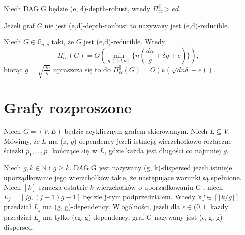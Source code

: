 \begin{theorem} \cite[Twierdzenie 4]{depth}
	Niech DAG G będzie (e, d)-depth-robust, wtedy $ \Pi_{ cc }^{ \parallel } > ed$.
\end{theorem}

\begin{definition}
	Jeżeli graf $G$ nie jest (e,d)-depth-roubust to nazywany jest (e,d)-reducible.
\end{definition}

\begin{theorem} \cite[Twierdzenie 10]{depth} \label{1::redu}
	Niech $G \in \mathbb{G}_{n, \delta}$ taki, że $G$ jest (e,d)-reducible. Wtedy
	$$ \Pi_{cc}^{\parallel}(G) = O \left( \min_{g \in [d,n]} \Big \lbrace n \left( \frac{dn}{g} + \delta g + e \right) \Big \rbrace \right), $$
	biorąc $g = \sqrt{ \frac{dn}{g}}$ upraszcza się to do $ \Pi_{cc}^{\parallel}(G) = O \left( n ( \sqrt{dn \delta} + e) \right)$.
\end{theorem}

\section{Grafy rozproszone}

\begin{definition}
	 Niech $G = (V, E)$ będzie acyklicznym grafem skierowanym.
	Niech $L \subseteq V$.
	Mówimy, że $L$ ma ($z$, $g$)-dependency jeżeli istnieją wierzchołkowo rozłączne ścieżki $p_{1}, \dots , p_{z}$ kończące się w $L$, gdzie każda jest długości co najmniej $g$.
\end{definition}

\begin{definition}
	 Niech $g, k \in \mathbb{N}$ i $g \geq k$. DAG G jest nazywany (g, k)-dispersed jeżeli istnieje uporządkowanie jego wierzchołków takie, że następujące warunki są spełnione.
	Niech $[k]$ oznacza ostatnie $k$ wierzchołków o uporządkowaniu G i niech $L_{j} = [jg, (j + 1)g - 1]$ będzie j-tym podprzedziałem.
	Wtedy $\forall j \in [ \lfloor k / g \rfloor ]$ przedział $L_{j}$ ma (g, g)-dependency.
	W ogólności, jeżeli dla $ \epsilon \in (0, 1] $ każdy przedział $L_{j}$ ma tylko ($\epsilon$g, g)-dependency, graf G nazywany jest ($\epsilon$, g, g)-dispersed.
\end{definition}

